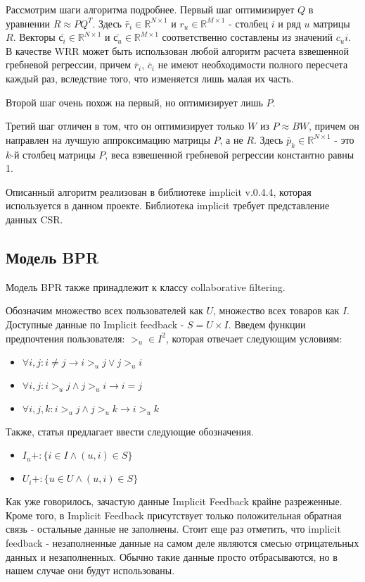 \documentclass[14pt]{mmcs_article}
\begin{document}
Рассмотрим шаги алгоритма подробнее.
Первый шаг оптимизирует $Q$ в уравнении $R \approx PQ^T$. Здесь $\bar r_i \in \mathbb{R}^{N \times 1}$  и  $r_u \in \mathbb{R}^{M \times 1}$ - столбец $i$ и ряд $u$ матрицы $R$. Векторы $ \bar{с_i} \in \mathbb{R}^{N \times 1}$ и $\bar{с_u} \in \mathbb{R}^{M \times 1}$ соответственно составлены из значений $c_ui$. В качестве WRR может быть использован любой алгоритм расчета взвешенной гребневой регрессии, причем $\bar r_i$, $\bar c_i$ не имеют необходимости полного пересчета каждый раз, вследствие того, что изменяется лишь малая их часть. 

Второй шаг очень похож на первый, но оптимизирует лишь $P$. 

Третий шаг отличен в том, что он оптимизирует только $W$ из $P \approx BW$, причем он направлен на лучшую аппроксимацию матрицы $P$, а не $R$. Здесь  $\bar p_k \in \mathbb{R}^{N \times 1}$ - это $k$-й столбец матрицы $P$, веса взвешенной гребневой регрессии константно равны 1.

Описанный алгоритм реализован в библиотеке implicit v.0.4.4, которая используется в данном проекте. Библиотека implicit требует представление данных CSR.


\subsection{Модель BPR}
Модель BPR также принадлежит к классу collaborative filtering. 

Обозначим множество всех пользователей как $U$, множество всех товаров как $I$. Доступные данные по Implicit feedback -  $S = U \times I$. Введем функции предпочтения пользователя: $ >_u \in I^2$, которая отвечает следующим условиям:
\begin{itemize}
	\item $\forall i, j : i \neq j \rightarrow i >_u j \vee j >_u i$
	\item $\forall i, j : i >_u j \wedge j >_u i \rightarrow i = j$
	\item $\forall i, j, k :  i >_u j \wedge j >_u k  \rightarrow i >_u k $
\end{itemize}
Также, статья \cite{BPR:1205} предлагает ввести следующие обозначения. 
\begin{itemize}
	\item $I_u+: \{i \in I \wedge (u,i) \in S\}$
	\item $U_i+: \{u \in U \wedge (u,i) \in S\}$
\end{itemize}

Как уже говорилось, зачастую данные Implicit Feedback крайне разреженные. Кроме того, в Implicit Feedback присутствует только положительная обратная связь - остальные данные не заполнены. Стоит еще раз отметить, что implicit feedback - незаполненные данные на самом деле являются смесью отрицательных данных и незаполненных.
Обычно такие данные просто отбрасываются, но в нашем случае они будут использованы.
\end{document}
